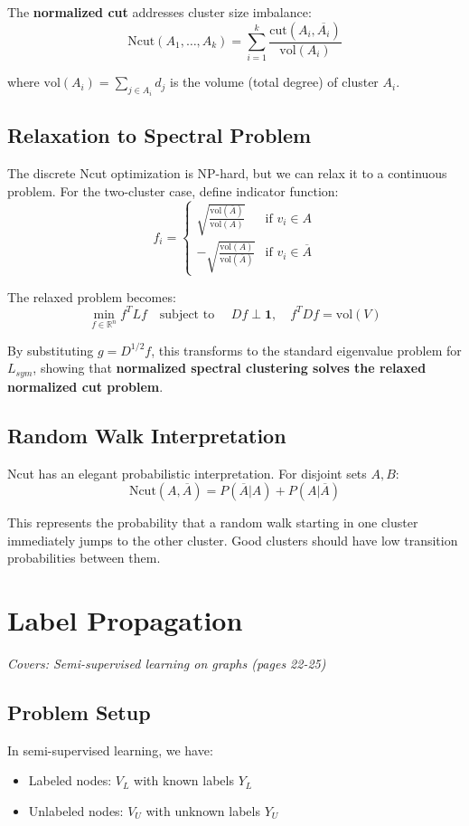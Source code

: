 \documentclass[11pt]{article}
\begin{document}
The \textbf{normalized cut} addresses cluster size imbalance:
$$\text{Ncut}(A_1, \ldots, A_k) = \sum_{i=1}^k \frac{\text{cut}(A_i, \overline{A_i})}{\text{vol}(A_i)}$$

where $\text{vol}(A_i) = \sum_{j \in A_i} d_j$ is the volume (total degree) of cluster $A_i$.

\subsection{Relaxation to Spectral Problem}
The discrete Ncut optimization is NP-hard, but we can relax it to a continuous problem. For the two-cluster case, define indicator function:
$$f_i = \begin{cases}
\sqrt{\frac{\text{vol}(\overline{A})}{\text{vol}(A)}} & \text{if } v_i \in A \\
-\sqrt{\frac{\text{vol}(A)}{\text{vol}(\overline{A})}} & \text{if } v_i \in \overline{A}
\end{cases}$$

The relaxed problem becomes:
$$\min_{f \in \mathbb{R}^n} f^T L f \quad \text{subject to } \quad Df \perp \mathbf{1}, \quad f^T D f = \text{vol}(V)$$

By substituting $g = D^{1/2}f$, this transforms to the standard eigenvalue problem for $L_{sym}$, showing that \textbf{normalized spectral clustering solves the relaxed normalized cut problem}.

\subsection{Random Walk Interpretation}
Ncut has an elegant probabilistic interpretation. For disjoint sets $A, B$:
$$\text{Ncut}(A, \overline{A}) = P(\overline{A}|A) + P(A|\overline{A})$$

This represents the probability that a random walk starting in one cluster immediately jumps to the other cluster. Good clusters should have low transition probabilities between them.

\section{Label Propagation}
\textit{Covers: Semi-supervised learning on graphs (pages 22-25)}

\subsection{Problem Setup}
In semi-supervised learning, we have:
\begin{itemize}
\item Labeled nodes: $V_L$ with known labels $Y_L$
\item Unlabeled nodes: $V_U$ with unknown labels $Y_U$
\end{itemize}
\end{document}
